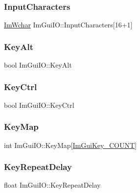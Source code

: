 \subsubsection{\texorpdfstring{Input\+Characters}{InputCharacters}}
{\footnotesize\ttfamily \mbox{\hyperlink{imgui_8h_af2c7badaf05a0008e15ef76d40875e97}{Im\+Wchar}} Im\+Gui\+I\+O\+::\+Input\+Characters\mbox{[}16+1\mbox{]}}

\mbox{\label{struct_im_gui_i_o_a1e64ef08a4448a2cac874496130992cb}} 
\subsubsection{\texorpdfstring{Key\+Alt}{KeyAlt}}
{\footnotesize\ttfamily bool Im\+Gui\+I\+O\+::\+Key\+Alt}

\mbox{\label{struct_im_gui_i_o_a51de8f65dcabb80ef4e0d3c759ffcd7f}} 
\subsubsection{\texorpdfstring{Key\+Ctrl}{KeyCtrl}}
{\footnotesize\ttfamily bool Im\+Gui\+I\+O\+::\+Key\+Ctrl}

\mbox{\label{struct_im_gui_i_o_aa1cd0083960f8e5361eb6d49973c8823}} 
\subsubsection{\texorpdfstring{Key\+Map}{KeyMap}}
{\footnotesize\ttfamily int Im\+Gui\+I\+O\+::\+Key\+Map\mbox{[}\mbox{\hyperlink{imgui_8h_a683cc5d09c63d74035a98ac3b0dec545aec3107a9dcdc5632cdcd57d4f8bbed18}{Im\+Gui\+Key\+\_\+\+C\+O\+U\+NT}}\mbox{]}}

\mbox{\label{struct_im_gui_i_o_a390537e7cba21b98a8f89df857ea59fb}} 
\subsubsection{\texorpdfstring{Key\+Repeat\+Delay}{KeyRepeatDelay}}
{\footnotesize\ttfamily float Im\+Gui\+I\+O\+::\+Key\+Repeat\+Delay}

